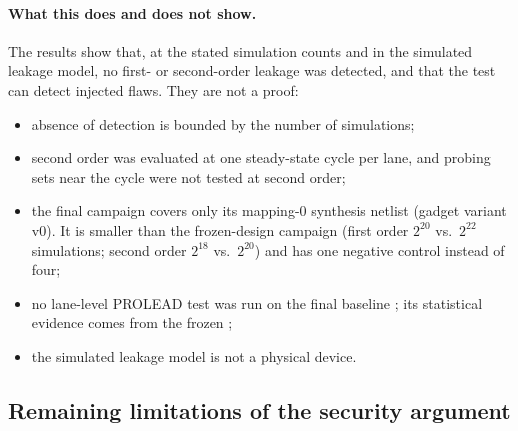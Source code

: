 \paragraph{What this does and does not show.} The results show that, at the stated simulation counts and in the simulated leakage model, no first- or second-order leakage was detected, and that the test can detect injected flaws. They are not a proof:
\begin{itemize}
  \item absence of detection is bounded by the number of simulations;
  \item second order was evaluated at one steady-state cycle per lane, and probing sets near the  cycle were not tested at second order;
  \item the final  campaign covers only its mapping-0 synthesis netlist (gadget variant v0). It is smaller than the frozen-design campaign (first order $2^{20}$ vs.\ $2^{22}$ simulations; second order $2^{18}$ vs.\ $2^{20}$) and has one negative control instead of four;
  \item no lane-level PROLEAD test was run on the final baseline ; its statistical evidence comes from the frozen ;
  \item the simulated leakage model is not a physical device.
\end{itemize}

\subsection{Remaining limitations of the security argument}\label{sec:sec-limits}
